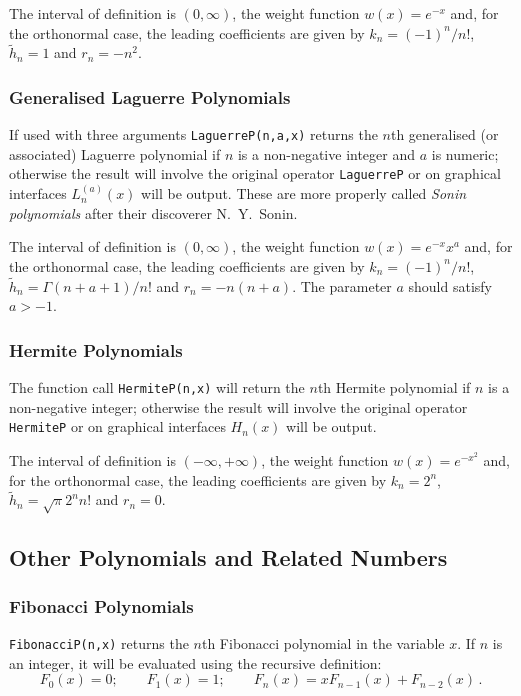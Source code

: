 The interval of definition is $(0, \infty)$, the weight function
$w(x)=e^{-x}$ and, for the orthonormal case, the leading coefficients
are given by $k_n=(-1)^n/n!$, $\tilde{h}_n =1$ and $r_n = -n^2$.

\subsubsection{Generalised Laguerre Polynomials}
If used with three arguments \texttt{LaguerreP(n,a,x)} returns the $n$th
generalised (or associated) Laguerre polynomial if $n$ is a non-negative
integer and $a$ is numeric; otherwise the result will involve the original
operator \texttt{LaguerreP} or on graphical interfaces $L_n^{(a)}(x)$ will be
output. These are more properly called \emph{Sonin polynomials} after their
discoverer N.~Y.~Sonin.

The interval of definition is $(0, \infty)$, the weight function
$w(x)=e^{-x}x^a$ and, for the orthonormal case, the leading coefficients
are given by $k_n=(-1)^n/n!$, $\tilde{h}_n = \Gamma(n+a+1)/n!$ and
$r_n=-n(n+a)$. The parameter $a$ should satisfy $a > -1$.

\subsubsection{Hermite Polynomials}
\hypertarget{HERMITEP}{}
The function call \texttt{HermiteP(n,x)} will return the $n$th Hermite
polynomial if $n$ is a non-negative integer; otherwise the result will involve
the original operator \texttt{HermiteP} or on graphical interfaces $H_n(x)$
will be output.

The interval of definition is $(-\infty, +\infty)$, the weight function
$w(x)=e^{-x^2}$ and,
for the orthonormal case, the leading coefficients are given by
$k_n=2^n$, $\tilde{h}_n = \sqrt{\pi}2^nn!$ and $r_n=0$.

\subsection{Other Polynomials and Related Numbers}

\subsubsection{Fibonacci Polynomials}
\hypertarget{FIBONACCIP}{}
\texttt{FibonacciP(n,x)} returns the $n$th Fibonacci polynomial
in the variable $x$. If $n$ is an integer, it will be
evaluated using the recursive definition:
\[F_0(x) = 0;\qquad F_1(x) = 1; \qquad F_n(x) = x F_{n-1}(x) + F_{n-2}(x)\,.\]

